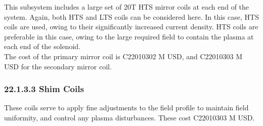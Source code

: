 This subsystem includes a large set of 20T HTS mirror coils at each end of the system. Again, both HTS and LTS coils can be considered here. In this case, HTS coils are used, owing to their significantly increased current density. HTS coils are preferable in this case, owing to the large required field to contain the plasma at each end of the solenoid.  \\

The cost of the primary mirror coil is C22010302 M USD, and C22010303 M USD for the secondary mirror coil. \\



\subsubsection*{22.1.3.3 Shim Coils}

These coils serve to apply fine adjustments to the field profile to maintain field uniformity, and control any plasma disturbances. These cost C22010303 M USD.\\

